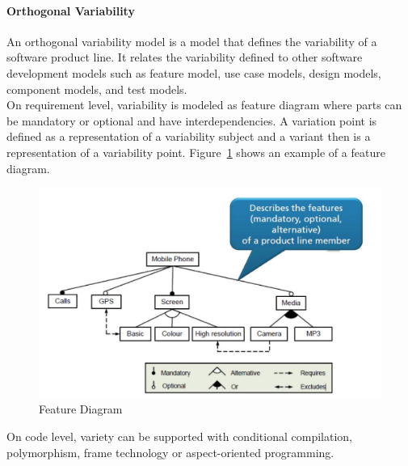 \paragraph{Orthogonal Variability}
An orthogonal variability model is a model that defines the variability of a software product line. It relates the variability defined to other software development models such as feature model, use case models, design models, component models, and test models.\\

On requirement level, variability is modeled as feature diagram where parts can be mandatory or optional and have interdependencies.
A variation point is defined as a representation of a variability subject and a variant then is a representation of a variability point.
Figure~\ref{fig:feature_diagram} shows an example of a feature diagram.\\
\begin{figure}[h]
  \centering
  \includegraphics[width=.8\textwidth]{images/feature_diagram.png}
  \caption{Feature Diagram}\label{fig:feature_diagram}
\end{figure}

On code level, variety can be supported with conditional compilation, polymorphism, frame technology or aspect-oriented programming.

